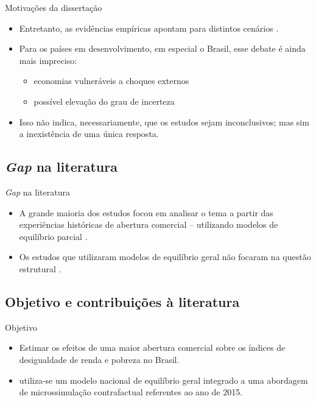\documentclass[10pt]{sintefbeamer}
\begin{document}
\begin{frame}{Motivações da dissertação}
	\begin{itemize}[<+->]
		\item Entretanto, as evidências empíricas apontam para distintos cenários \cite{winters04}.
		
		\item Para os países em desenvolvimento, em especial o Brasil, esse debate é ainda mais impreciso:
		
		\begin{itemize}
			\item economias vulneráveis a choques externos \cite{bannisterthugge01}
			
			\item possível elevação do grau de incerteza \cite{winters02}
		\end{itemize}
		
		\item Isso não indica, necessariamente, que os estudos sejam inconclusivos; mas sim a inexistência de uma única resposta.
	\end{itemize}
\end{frame}


\subsection{\textit{Gap} na literatura}

\begin{frame}{\textit{Gap} na literatura}
	\begin{itemize}[<+->]
		\item A grande maioria dos estudos focou em analisar o tema a partir das experiências históricas de abertura comercial -- utilizando modelos de equilíbrio parcial \cite{castilho12, bayar17}.
		
		\item Os estudos que utilizaram modelos de equilíbrio geral não focaram na questão estrutural \cite{borrazetal12, estrades12, campostimini22}.
	\end{itemize}
\end{frame}


\subsection{Objetivo e contribuições à literatura}

\begin{frame}{Objetivo}
	\begin{itemize}[<+->]
		\item Estimar os efeitos de uma maior abertura comercial sobre os índices de desigualdade de renda e pobreza no Brasil.
		
		\item utiliza-se um modelo nacional de equilíbrio geral integrado a uma abordagem de microssimulação contrafactual referentes ao ano de 2015.
	\end{itemize}
\end{frame}
\end{document}
